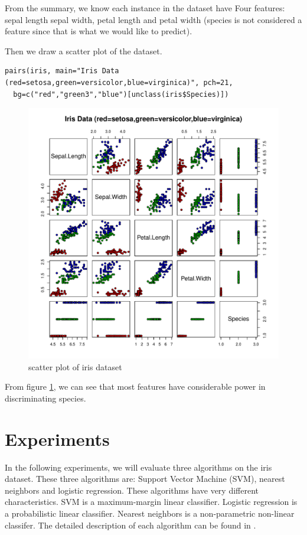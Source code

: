 \documentclass[a4paper, 11pt]{article}
\begin{document}
 From the summary, we know each instance in the dataset have Four features: 
sepal length sepal width, petal length and petal width
(species is not considered a feature since that is what we would like to predict).

Then we draw a scatter plot of the dataset.
\begin{verbatim}
pairs(iris, main="Iris Data (red=setosa,green=versicolor,blue=virginica)", pch=21,
  bg=c("red","green3","blue")[unclass(iris$Species)])
\end{verbatim}

\begin{figure}[htbp]
  \begin{center}
    \includegraphics[width=0.75\linewidth]{1.pdf}
  \end{center}
  \caption{scatter plot of iris dataset}
  \label{fig:iris}
\end{figure}
 
From figure \ref{fig:iris}, we can see that most features have considerable power in 
discriminating species.


\section{Experiments}
In the following experiments, we will
evaluate three algorithms on the iris dataset.
These three algorithms are: Support Vector Machine (SVM),
nearest neighbors and logistic regression.
These algorithms have very different characteristics.
SVM is a maximum-margin linear classifier.
Logistic regression is a probabilistic linear classifier.
Nearest neighbors is a non-parametric non-linear classifer.
The detailed description of each algorithm can be found in \cite{prml}.
\end{document}
